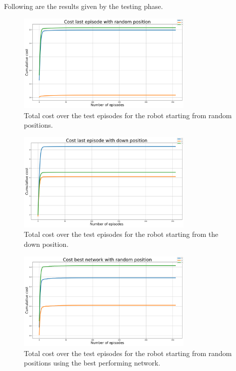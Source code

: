 \documentclass[twocolumn, a4paper]{article}
\begin{document}
Following are the results given by the testing phase.
\label{fig:Test_1_random_pos}
\begin{figure}[H]
	\centering
	\includegraphics[width=8.5cm]{"../Figures/loss_last_ep_random_positions_1J_500E_256EL.png"}
	\caption{Total cost over the test episodes for the robot starting
			 from random positions.}
\end{figure}
\vspace{-1cm}
\label{fig:Test_1_down_pos}
\begin{figure}[H]
	\centering
	\includegraphics[width=8.5cm]{"../Figures/loss_last_ep_down_positions_1J_500E_256EL.png"}
	\caption{Total cost over the test episodes for the robot starting
			 from the down position.}
\end{figure}
\vspace{-1cm}
\label{fig:Test_1_best_random_pos}
\begin{figure}[H]
	\centering
	\includegraphics[width=8.5cm]{"../Figures/loss_best_net_random_positions_1J_500E_256EL.png"}
	\caption{Total cost over the test episodes for the robot starting from
			 random positions using the best performing network.}
\end{figure}
\end{document}
